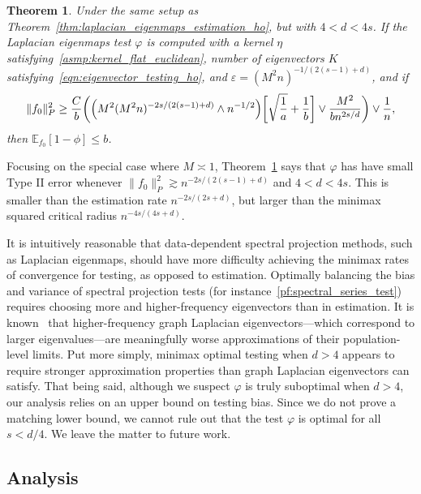 \documentclass[aos]{imsart}
\theoremstyle{plain}
\newtheorem{theorem}{Theorem}
\theoremstyle{definition}
\theoremstyle{remark}
\newcommand{\Ebb}{\mathbb{E}}
\newcommand{\1}{\mathbf{1}}
\begin{document}
\begin{theorem}
	\label{thm:laplacian_eigenmaps_testing_ho_suboptimal}
	Under the same setup as Theorem~\ref{thm:laplacian_eigenmaps_estimation_ho}, but with $4 < d < 4s$. If the Laplacian eigenmaps test $\varphi$ is computed with a kernel $\eta$ satisfying~\ref{asmp:kernel_flat_euclidean}, number of eigenvectors $K$ satisfying~\eqref{eqn:eigenvector_testing_ho}, and $\varepsilon = (M^2n)^{-1/(2(s - 1) + d)}$, and if 
	\begin{equation}
	\label{eqn:laplacian_eigenmaps_testing_criticalradius_ho_suboptimal}
	\|f_0\|_P^2 \geq \frac{C}{b}\biggl(\Bigl(M^2(M^2n)^{-2s/(2(s - 1) + d) } \wedge n^{-1/2}\Bigr)\biggl[\sqrt{\frac{1}{a}} + \frac{1}{b}\biggr] \vee \frac{M^2}{b n^{2s/d}} \biggr) \vee \frac{1}{n},
	\end{equation}
	then $\Ebb_{f_0}[1 - \phi] \leq b$.
\end{theorem}
Focusing on the special case where $M \asymp 1$, Theorem~\ref{thm:laplacian_eigenmaps_testing_ho_suboptimal} says that $\varphi$ has have small Type II error whenever $\|f_0\|_P^2 \gtrsim n^{-2s/(2(s - 1) + d)}$ and $4 < d < 4s$. This is smaller than the estimation rate $n^{-2s/(2s + d)}$, but larger than the minimax squared critical radius $n^{-4s/(4s + d)}$. 

It is intuitively reasonable that data-dependent spectral projection methods, such as Laplacian eigenmaps, should have more difficulty achieving the minimax rates of convergence for testing, as opposed to estimation. Optimally balancing the bias and variance of spectral projection tests (for instance~\eqref{pf:spectral_series_test}) requires choosing more and higher-frequency eigenvectors than in estimation. It is known~\citep{trillos2019} that higher-frequency graph Laplacian eigenvectors---which correspond to larger eigenvalues---are meaningfully worse approximations of their population-level limits. Put more simply, minimax optimal testing when $d > 4$ appears to require stronger approximation properties than graph Laplacian eigenvectors can satisfy.  That being said, although we suspect $\varphi$ is truly suboptimal when $d > 4$, our analysis relies on an upper bound on testing bias. Since we do not prove a matching lower bound, we cannot rule out that the test $\varphi$ is optimal for all $s < d/4$. We leave the matter to future work.

\subsection{Analysis}
\label{subsec:analysis}
\end{document}
